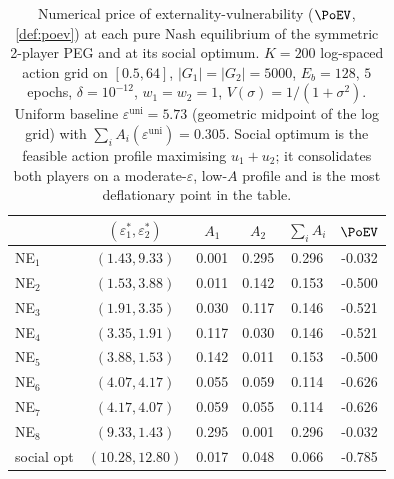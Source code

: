 \begin{table}[t]
\centering
\caption{Numerical price of externality-vulnerability ($\PoEV$, \cref{def:poev}) at each pure Nash equilibrium of the symmetric 2-player PEG and at its social optimum. $K=200$ log-spaced action grid on $[0.5,64]$, $|G_1|=|G_2|=5000$, $E_b=128$, $5$ epochs, $\delta=10^{-12}$, $w_1=w_2=1$, $V(\sigma) = 1/(1+\sigma^2)$. Uniform baseline $\varepsilon^{\mathrm{uni}} = 5.73$ (geometric midpoint of the log grid) with $\sum_i A_i(\varepsilon^{\mathrm{uni}}) = 0.305$. Social optimum is the feasible action profile maximising $u_1 + u_2$; it consolidates both players on a moderate-$\varepsilon$, low-$A$ profile and is the most deflationary point in the table.}
\label{tab:PoEV}
\begin{tabular}{lccccc}
\toprule
 & $(\varepsilon_1^*, \varepsilon_2^*)$ & $A_1$ & $A_2$ & $\sum_i A_i$ & $\PoEV$ \\
\midrule
NE$_{1}$ & $(1.43, 9.33)$ & 0.001 & 0.295 & 0.296 & -0.032 \\
NE$_{2}$ & $(1.53, 3.88)$ & 0.011 & 0.142 & 0.153 & -0.500 \\
NE$_{3}$ & $(1.91, 3.35)$ & 0.030 & 0.117 & 0.146 & -0.521 \\
NE$_{4}$ & $(3.35, 1.91)$ & 0.117 & 0.030 & 0.146 & -0.521 \\
NE$_{5}$ & $(3.88, 1.53)$ & 0.142 & 0.011 & 0.153 & -0.500 \\
NE$_{6}$ & $(4.07, 4.17)$ & 0.055 & 0.059 & 0.114 & -0.626 \\
NE$_{7}$ & $(4.17, 4.07)$ & 0.059 & 0.055 & 0.114 & -0.626 \\
NE$_{8}$ & $(9.33, 1.43)$ & 0.295 & 0.001 & 0.296 & -0.032 \\
social opt & $(10.28, 12.80)$ & 0.017 & 0.048 & 0.066 & -0.785 \\
\bottomrule
\end{tabular}
\end{table}
